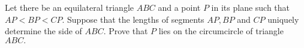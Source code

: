 Let there be an equilateral triangle $ABC$ and a point $P$ in its plane such that $AP<BP<CP.$  Suppose that the lengths of segments $AP,BP$ and $CP$ uniquely determine the side of $ABC$. Prove that $P$ lies on the circumcircle of triangle $ABC.$